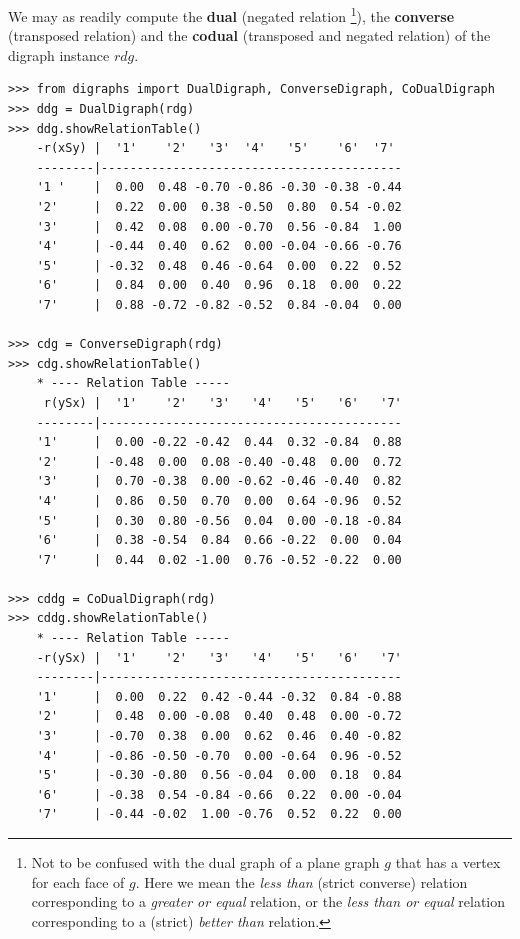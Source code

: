 We may as readily compute the \textbf{dual} (negated relation \footnote{Not to be confused with the dual graph of a plane graph $g$ that has a vertex for each face of $g$. Here we mean the \emph{less than} (strict converse) relation corresponding to a \emph{greater or equal} relation, or the \emph{less than or equal} relation corresponding to a (strict) \emph{better than} relation.}), the \textbf{converse} (transposed relation) and the \textbf{codual} (transposed and negated relation) of the digraph instance $rdg$. 
\begin{lstlisting}[caption={Computing dual, converse and codual},label=list:2.7]
>>> from digraphs import DualDigraph, ConverseDigraph, CoDualDigraph
>>> ddg = DualDigraph(rdg)
>>> ddg.showRelationTable()
    -r(xSy) |  '1'    '2'   '3'  '4'   '5'    '6'  '7'	  
    --------|------------------------------------------
    '1 '    |  0.00  0.48 -0.70 -0.86 -0.30 -0.38 -0.44	 
    '2'     |  0.22  0.00  0.38 -0.50  0.80  0.54 -0.02	 
    '3'     |  0.42  0.08  0.00 -0.70  0.56 -0.84  1.00	 
    '4'     | -0.44  0.40  0.62  0.00 -0.04 -0.66 -0.76	 
    '5'     | -0.32  0.48  0.46 -0.64  0.00  0.22  0.52	 
    '6'     |  0.84  0.00  0.40  0.96  0.18  0.00  0.22	 
    '7'     |  0.88 -0.72 -0.82 -0.52  0.84 -0.04  0.00

>>> cdg = ConverseDigraph(rdg)
>>> cdg.showRelationTable()
    * ---- Relation Table -----
     r(ySx) |  '1'    '2'   '3'   '4'   '5'   '6'   '7'	  
    --------|------------------------------------------
    '1'     |  0.00 -0.22 -0.42  0.44  0.32 -0.84  0.88	 
    '2'     | -0.48  0.00  0.08 -0.40 -0.48  0.00  0.72	 
    '3'     |  0.70 -0.38  0.00 -0.62 -0.46 -0.40  0.82	 
    '4'     |  0.86  0.50  0.70  0.00  0.64 -0.96  0.52	 
    '5'     |  0.30  0.80 -0.56  0.04  0.00 -0.18 -0.84	 
    '6'     |  0.38 -0.54  0.84  0.66 -0.22  0.00  0.04	 
    '7'     |  0.44  0.02 -1.00  0.76 -0.52 -0.22  0.00	 

>>> cddg = CoDualDigraph(rdg)
>>> cddg.showRelationTable()
    * ---- Relation Table -----
    -r(ySx) |  '1'    '2'   '3'   '4'   '5'   '6'   '7'	    
    --------|------------------------------------------
    '1'     |  0.00  0.22  0.42 -0.44 -0.32  0.84 -0.88	 
    '2'     |  0.48  0.00 -0.08  0.40  0.48  0.00 -0.72	 
    '3'     | -0.70  0.38  0.00  0.62  0.46  0.40 -0.82	 
    '4'     | -0.86 -0.50 -0.70  0.00 -0.64  0.96 -0.52	 
    '5'     | -0.30 -0.80  0.56 -0.04  0.00  0.18  0.84	 
    '6'     | -0.38  0.54 -0.84 -0.66  0.22  0.00 -0.04	 
    '7'     | -0.44 -0.02  1.00 -0.76  0.52  0.22  0.00	 
\end{lstlisting}
  
